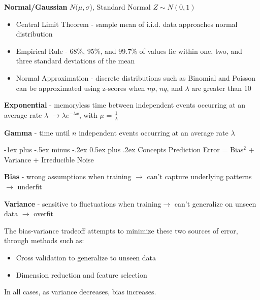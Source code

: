 \documentclass[10pt,landscape]{article}
\makeatletter
\renewcommand{\section}{\@startsection{section}{1}{0mm}%
                                {-1ex plus -.5ex minus -.2ex}%
                                {0.5ex plus .2ex}%
                                {\normalfont\large\bfseries}}
\makeatother
\begin{document}
\begin{multicols}{3}
    \textbf{Normal/Gaussian} $N(\mu,\sigma$), Standard Normal $Z\sim N(0, 1)$

    \begin{itemize}[label={--},leftmargin=4mm]
        \itemsep -.4mm
              \vspace{-.5mm}
        \item Central Limit Theorem - sample mean of i.i.d. data approaches normal distribution
        \item Empirical Rule - 68\%, 95\%, and 99.7\% of values lie within one, two, and three standard deviations of the mean
        \item Normal Approximation - discrete distributions such as Binomial and Poisson can be approximated using z-scores when $np$, $nq$, and $\lambda$ are greater than 10
    \end{itemize}

    \textbf{Exponential} - memoryless time between independent events occurring at an average rate $\lambda$ $\to \lambda e^{-\lambda x}$, with $\mu$ = $\frac{1}{\lambda}$

    \textbf{Gamma} - time until $n$ independent events occurring at an average rate $\lambda$

    \section{Concepts}
    Prediction Error = Bias$^2$ + Variance + Irreducible Noise

    \textbf{Bias} - wrong assumptions when training $\to$ can't capture underlying patterns $\to$ underfit

    \textbf{Variance} - sensitive to fluctuations when training$\to$ can't generalize on unseen data $\to$ overfit

    The bias-variance tradeoff attempts to minimize these two sources of error, through methods such as:
    \begin{itemize}[label={--},leftmargin=4mm]
        \itemsep -.4mm
              \vspace{-.5mm}
        \item Cross validation to generalize to unseen data
        \item Dimension reduction and feature selection
    \end{itemize}
    \vspace{-.5mm}
    In all cases, as variance decreases, bias increases.


\end{multicols}
\end{document}
